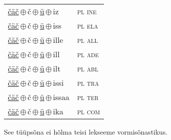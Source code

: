 \begin{minipage}{\textwidth}
\begin{sideways}
\begin{tabular}{l l}
\underline{čäč}\,$\oplus$\,č\,$\oplus$\,\underline{ü}\,$\oplus$\,iz & \textsc{ pl ine } \\
\underline{čäč}\,$\oplus$\,č\,$\oplus$\,\underline{ü}\,$\oplus$\,iss & \textsc{ pl ela } \\
\underline{čäč}\,$\oplus$\,č\,$\oplus$\,\underline{ü}\,$\oplus$\,ille & \textsc{ pl all } \\
\underline{čäč}\,$\oplus$\,č\,$\oplus$\,\underline{ü}\,$\oplus$\,ill & \textsc{ pl ade } \\
\underline{čäč}\,$\oplus$\,č\,$\oplus$\,\underline{ü}\,$\oplus$\,ilt & \textsc{ pl abl } \\
\underline{čäč}\,$\oplus$\,č\,$\oplus$\,\underline{ü}\,$\oplus$\,issi & \textsc{ pl tra } \\
\underline{čäč}\,$\oplus$\,č\,$\oplus$\,\underline{ü}\,$\oplus$\,issaa & \textsc{ pl ter } \\
\underline{čäč}\,$\oplus$\,č\,$\oplus$\,\underline{ü}\,$\oplus$\,ika & \textsc{ pl com } \\
\end{tabular}
\end{sideways}
\label{tab:tüüpsõnamall-čäčüd}

\end{minipage}

 
\vspace{1em}
\noindent See tüüpsõna ei hõlma teisi lekseeme vormi\-sõnastikus.
